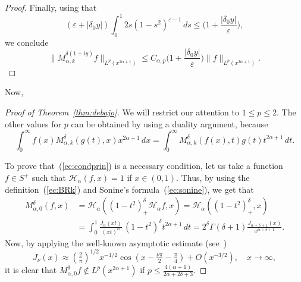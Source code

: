 \documentclass{amsart}
\theoremstyle{remark}
\newcommand{\htr}{\mathcal{H}_{\alpha}}
\newcommand{\BRk}{M_{\alpha,k}^{\delta}}
\newcommand{\BRkd}[1]{M_{\alpha,k}^{\delta(#1)}} %
\newcommand{\lpnorm}[2]{\|{#1}\|_{L^{#2}(x^{2\alpha+1})}}
\begin{document}
\begin{proof}
Finally, using that
\begin{equation*}
    (\varepsilon+|\delta_0y|) \int_0^1 2s(1-s^2)^{\varepsilon-1} \, ds
    \le \Big( 1+\frac{|\delta_0y|}{\varepsilon} \Big),
\end{equation*}
we conclude
\begin{equation*}
    \lpnorm{\BRkd{1+iy}f}{p}
    \le C_{\alpha,p} \Big( 1+\frac{|\delta_0y|}{\varepsilon} \Big)
    \lpnorm{f}{p}.
\end{equation*}
\end{proof}

Now,

\begin{proof}[Proof of Theorem~\ref{thm:debajo}]
We will restrict our attention to $1\le p \le 2$. The other values for $p$
can be obtained by using a duality argument, because
\begin{equation*}
    \int_0^\infty f(x) \BRk(g(t),x) x^{2\alpha+1} \, dx
    = \int_0^\infty \BRk(f(x),t) g(t) t^{2\alpha+1} \, dt.
\end{equation*}

To prove that~(\ref{ec:condprin}) is a necessary condition, let us take
a function $f \in S^+$ such that $\htr(f,x) = 1$ if $x \in (0,1)$. Thus,
by using the definition~(\ref{ec:BRk}) and Sonine's formula~(\ref{ec:sonine}),
we get that
\begin{align*}
    M_{\alpha,0}^{\delta}(f,x)
    &= \htr((1-t^2)^\delta_+ \htr f, x) = \htr((1-t^2)^\delta_+, x) \\
    &= \int_0^1 \frac{J_\alpha(xt)}{(xt)^\alpha} \,
          (1-t^2)^\delta t^{2\alpha+1} \, dt
      = 2^\delta \Gamma(\delta+1)
          \frac{J_{\alpha+\delta+1}(x)}{x^{\alpha+\delta+1}}.
\end{align*}
Now, by applying the well-known asymptotic estimate (see~\cite[\S~7.21
(1), p.~199]{Wat})
\begin{equation*}
    J_\nu(x) \approx {(\tfrac2\pi)}^{1/2} x^{-1/2}
       \cos(x-\tfrac{\nu\pi}2-\tfrac\pi4) + O(x^{-3/2}),
    \quad x\to\infty,
\end{equation*}
it is clear that $M_{\alpha,0}^{\delta}f \notin L^p(x^{2\alpha+1})$
if $p \le \frac{4(\alpha+1)}{2\alpha+2\delta+3}$.


\end{proof}
\end{document}
